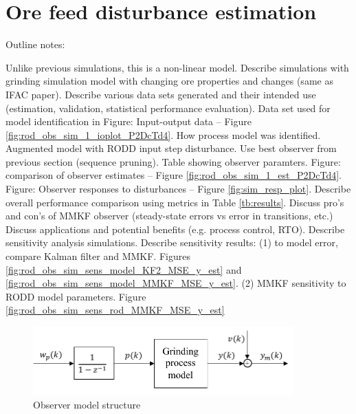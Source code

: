 \section{Ore feed disturbance estimation} \label{sim-ore-SISO}

Outline notes:
\begin{outline}
	\1 Unlike previous simulations, this is a non-linear model.
	\1 Describe simulations with grinding simulation model with changing ore properties and changes (same as IFAC paper).
	\1 Describe various data sets generated and their intended use (estimation, validation, statistical performance evaluation).
	\1 Data set used for model identification in Figure: Input-output data – Figure \ref{fig:rod_obs_sim_1_ioplot_P2DcTd4}.
	\1 How process model was identified.
	\1 Augmented model with RODD input step disturbance.
	\1 Use best observer from previous section (sequence pruning).
	\1 Table showing observer paramters.
	\1 Figure: comparison of observer estimates – Figure \ref{fig:rod_obs_sim_1_est_P2DcTd4}.
	\1 Figure: Observer responses to disturbances – Figure \ref{fig:sim_resp_plot}.
	\1 Describe overall performance comparison using metrics in Table \ref{tb:results}.
	\1 Discuss pro's and con's of MMKF observer (steady-state errors vs error in transitions, etc.)
	\1 Discuss applications and potential benefits (e.g. process control, RTO).
	\1 Describe sensitivity analysis simulations.
	\1 Describe sensitivity results:
	\2 (1) to model error, compare Kalman filter and MMKF. Figures \ref{fig:rod_obs_sim_sens_model_KF2_MSE_y_est} and \ref{fig:rod_obs_sim_sens_model_MMKF_MSE_y_est}.
	\2 (2) MMKF sensitivity to RODD model parameters. Figure  \ref{fig:rod_obs_sim_sens_rod_MMKF_MSE_y_est}
\end{outline}

\begin{figure}[htp]
	\centering
	\includegraphics[width=10cm]{images/obs-model-diag.pdf}
	\caption{Observer model structure}
	\label{fig:obs_model}
\end{figure}

